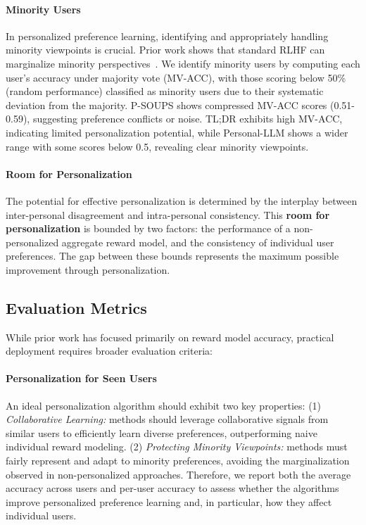 \paragraph{Minority Users} 
In personalized preference learning, identifying and appropriately handling minority viewpoints is crucial. Prior work shows that standard RLHF can marginalize minority perspectives~\citep{chakrabortymaxmin}. We identify minority users by computing each user's accuracy under majority vote (MV-ACC), with those scoring below 50\% (random performance) classified as minority users due to their systematic deviation from the majority. P-SOUPS shows compressed MV-ACC scores (0.51-0.59), suggesting preference conflicts or noise. TL;DR exhibits high MV-ACC, indicating limited personalization potential, while Personal-LLM shows a wider range with some scores below 0.5, revealing clear minority viewpoints.

\paragraph{Room for Personalization} 
The potential for effective personalization is determined by the interplay between inter-personal disagreement and intra-personal consistency. This \textbf{room for personalization} is bounded by two factors: the performance of a non-personalized aggregate reward model, and the consistency of individual user preferences. The gap between these bounds represents the maximum possible improvement through personalization.














\subsection{Evaluation Metrics}
\label{subsection: metrics}
While prior work has focused primarily on reward model accuracy, practical deployment requires broader evaluation criteria:
\paragraph{Personalization for Seen Users}
An ideal personalization algorithm should exhibit two key properties: (1) \textit{Collaborative Learning:} methods should leverage collaborative signals from similar users to efficiently learn diverse preferences, outperforming naive individual reward modeling. (2) \textit{Protecting Minority Viewpoints:} methods must fairly represent and adapt to minority preferences, avoiding the marginalization observed in non-personalized approaches. Therefore, we report both the average accuracy across users and per-user accuracy to assess whether the algorithms improve personalized preference learning and, in particular, how they affect individual users. 

